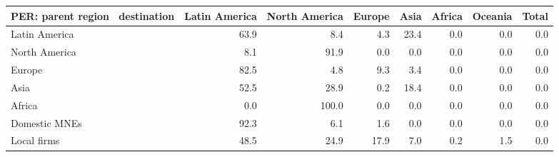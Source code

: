 \begin{tabular}{lrrrrrrr}
\toprule
PER: parent region \ destination & Latin America & North America & Europe & Asia & Africa & Oceania & Total \\
\midrule
Latin America & 63.9 & 8.4 & 4.3 & 23.4 & 0.0 & 0.0 & 0.0 \\
North America & 8.1 & 91.9 & 0.0 & 0.0 & 0.0 & 0.0 & 0.0 \\
Europe & 82.5 & 4.8 & 9.3 & 3.4 & 0.0 & 0.0 & 0.0 \\
Asia & 52.5 & 28.9 & 0.2 & 18.4 & 0.0 & 0.0 & 0.0 \\
Africa & 0.0 & 100.0 & 0.0 & 0.0 & 0.0 & 0.0 & 0.0 \\
Domestic MNEs & 92.3 & 6.1 & 1.6 & 0.0 & 0.0 & 0.0 & 0.0 \\
Local firms & 48.5 & 24.9 & 17.9 & 7.0 & 0.2 & 1.5 & 0.0 \\
\bottomrule
\end{tabular}
